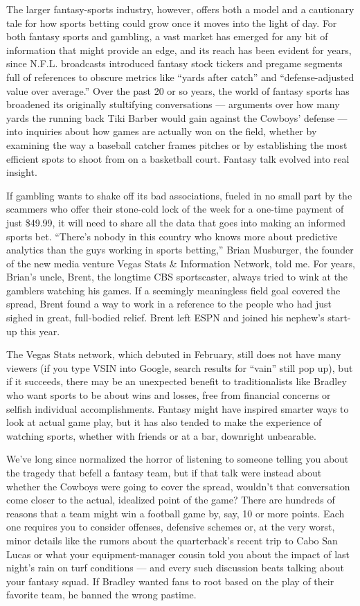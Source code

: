 The larger fantasy-sports industry, however, offers both a model and a
cautionary tale for how sports betting could grow once it moves into the
light of day. For both fantasy sports and gambling, a vast market has
emerged for any bit of information that might provide an edge, and its
reach has been evident for years, since N.F.L. broadcasts introduced
fantasy stock tickers and pregame segments full of references to obscure
metrics like ``yards after catch'' and ``defense-adjusted value over
average.'' Over the past 20 or so years, the world of fantasy sports has
broadened its originally stultifying conversations --- arguments over
how many yards the running back Tiki Barber would gain against the
Cowboys' defense --- into inquiries about how games are actually won on
the field, whether by examining the way a baseball catcher frames
pitches or by establishing the most efficient spots to shoot from on a
basketball court. Fantasy talk evolved into real insight.

If gambling wants to shake off its bad associations, fueled in no small
part by the scammers who offer their stone-cold lock of the week for a
one-time payment of just \$49.99, it will need to share all the data
that goes into making an informed sports bet. ``There's nobody in this
country who knows more about predictive analytics than the guys working
in sports betting,'' Brian Musburger, the founder of the new media
venture Vegas Stats \& Information Network, told me. For years, Brian's
uncle, Brent, the longtime CBS sportscaster, always tried to wink at the
gamblers watching his games. If a seemingly meaningless field goal
covered the spread, Brent found a way to work in a reference to the
people who had just sighed in great, full-bodied relief. Brent left ESPN
and joined his nephew's start-up this year.

The Vegas Stats network, which debuted in February, still does not have
many viewers (if you type VSIN into Google, search results for ``vain''
still pop up), but if it succeeds, there may be an unexpected benefit to
traditionalists like Bradley who want sports to be about wins and
losses, free from financial concerns or selfish individual
accomplishments. Fantasy might have inspired smarter ways to look at
actual game play, but it has also tended to make the experience of
watching sports, whether with friends or at a bar, downright unbearable.

We've long since normalized the horror of listening to someone telling
you about the tragedy that befell a fantasy team, but if that talk were
instead about whether the Cowboys were going to cover the spread,
wouldn't that conversation come closer to the actual, idealized point of
the game? There are hundreds of reasons that a team might win a football
game by, say, 10 or more points. Each one requires you to consider
offenses, defensive schemes or, at the very worst, minor details like
the rumors about the quarterback's recent trip to Cabo San Lucas or what
your equipment-manager cousin told you about the impact of last night's
rain on turf conditions --- and every such discussion beats talking
about your fantasy squad. If Bradley wanted fans to root based on the
play of their favorite team, he banned the wrong pastime.

